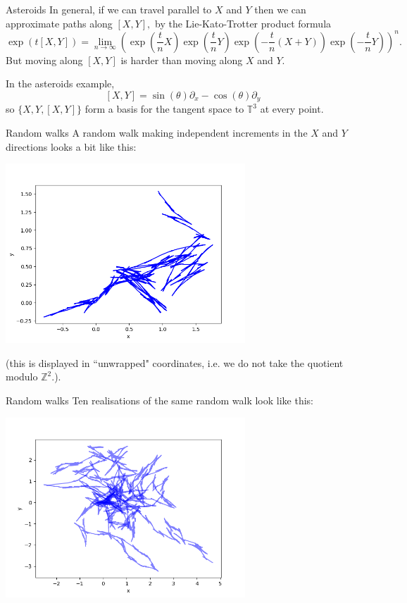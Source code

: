 \documentclass{beamer}
\numberwithin{equation}{section}
\theoremstyle{plain}
\theoremstyle{plain}
\theoremstyle{definition}
\theoremstyle{plain}
\theoremstyle{plain}
\theoremstyle{definition}
\newcommand{\Itgr}{\mathbb{Z}}
\newcommand{\Circ}{\mathbb{T}}
\begin{document}
\begin{frame}{Asteroids}
  In general, if we can travel parallel to $X$ and $Y$ then we can approximate paths along $[X,Y],$ by the Lie-Kato-Trotter product formula
  \[
    \exp(t[X,Y]) = \lim_{n\to\infty} (\exp(\frac{t}{n}X)\exp(\frac{t}{n}Y)\exp(-\frac{t}{n}(X+Y))\exp(-\frac{t}{n}Y))^n.
  \]
  But moving along $[X,Y]$ is harder than moving along $X$ and $Y.$

  In the asteroids example,
  \[
    [X,Y] = \sin(\theta)\partial_x-\cos(\theta)\partial_y
  \]
  so $\{X,Y,[X,Y]\}$ form a basis for the tangent space to $\Circ^3$ at every point.
\end{frame}

\begin{frame}{Random walks}
  A random walk making independent increments in the $X$ and $Y$ directions looks a bit like this:
  \begin{center}
  \includegraphics[width=90mm]{xy_coords_single_paths.png}
  \end{center}
  (this is displayed in ``unwrapped" coordinates, i.e. we do not take the quotient modulo $\Itgr^2.$).
\end{frame}

\begin{frame}{Random walks}
  Ten realisations of the same random walk look like this:
  \begin{center}
    \includegraphics[width=90mm]{xy_coords_multiple_paths.png}
  \end{center}
\end{frame}
\end{document}
